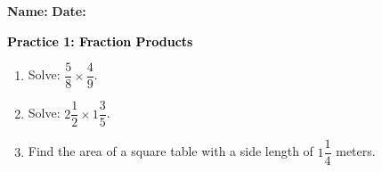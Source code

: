 \documentclass[12pt, letterpaper, fleqn]{article}
\begin{document}
\textbf{Name:} \underline{\hspace{5cm}}
\hfill
\textbf{Date:} \underline{\hspace{3cm}}\\

\begin{tcolorbox}[colback=customteal!20]
    \large\textcolor{black}{\textbf{Practice 1: Fraction Products}}
\end{tcolorbox}
\begin{enumerate}[itemsep=3.5cm, leftmargin=0.6cm]
\item Solve: $\dfrac{5}{8} \times \dfrac{4}{9}$.
\vspace{3.5cm}
\item Solve: $2\dfrac{1}{2} \times 1\dfrac{3}{5}$.
\vspace{3.5cm}
\item Find the area of a square table with a side length of $1\dfrac{1}{4}$ meters.
\end{enumerate}
\end{document}
